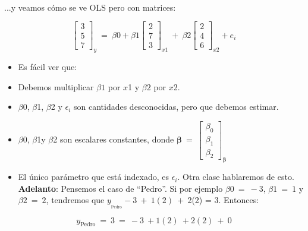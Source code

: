 \documentclass[10pt]{article}
\begin{document}
\paragraph{}...y veamos c\'omo se ve OLS pero con matrices:


\begin{equation*}
\begin{bmatrix}
3\\
5\\
7
\end{bmatrix}_{y} \ =\ \beta 0+\beta 1\begin{bmatrix}
2\\
7\\
3
\end{bmatrix}_{x1} \ +\ \beta 2\begin{bmatrix}
2\\
4\\
6
\end{bmatrix}_{x2} +e_{i}
\end{equation*}


\begin{itemize}
\item Es f\'acil ver que:
\item Debemos multiplicar $\displaystyle \beta 1$ por $\displaystyle x$1 y $\displaystyle \beta 2$ por $\displaystyle x$2.
\item $\displaystyle \beta $0, $\displaystyle \beta $1, $\displaystyle \beta $2 y $\displaystyle \epsilon_{i}$ son cantidades desconocidas, pero que debemos estimar.
\item $\displaystyle \beta $0, $\displaystyle \beta $1y $\displaystyle \beta $2 son escalares constantes, donde $\boldsymbol{\beta} \ =\ \begin{bmatrix} \beta_{0}\\\beta_{1}\\\beta_{2}\end{bmatrix}_{\boldsymbol{\beta}}$
\item El \'unico par\'ametro que est\'a indexado, es $\displaystyle \epsilon _{i}$. Otra clase hablaremos de esto. \textbf{Adelanto}: Pensemos el caso de ``Pedro''. Si por ejemplo $\displaystyle \beta 0\ =\ -3$, $\displaystyle \beta 1\ =\ 1$ y $\displaystyle \beta 2\ =\ 2$, tendremos que $\displaystyle y_{_{\text{Pedro}}} -3\ +\ 1( 2) \ +\ $2(2) = 3. Entonces:
\end{itemize}


\begin{equation*}
y_{\text{Pedro}} \ =\ 3\ =\ -3\ +1( 2) \ +2( 2) \ +\ 0
\end{equation*}
\end{document}
